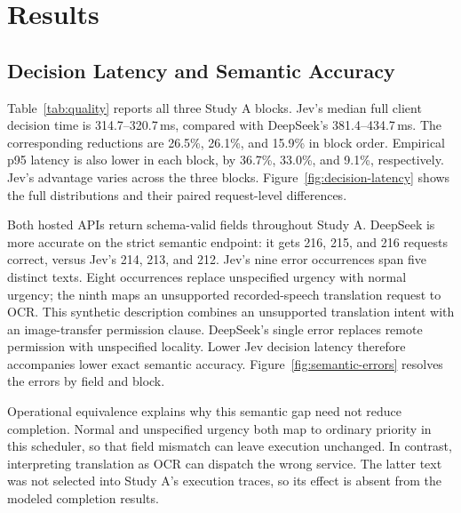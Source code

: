 \section{Results}
\label{sec:results}
\subsection{Decision Latency and Semantic Accuracy}

Table~\ref{tab:quality} reports all three Study A blocks. Jev's median full
client decision time is 314.7--320.7\,ms, compared with DeepSeek's
381.4--434.7\,ms. The corresponding reductions are 26.5\%, 26.1\%, and
15.9\% in block order. Empirical p95 latency is also lower in each block,
by 36.7\%, 33.0\%, and 9.1\%, respectively. Jev's advantage varies across
the three blocks. Figure~\ref{fig:decision-latency} shows the full distributions
and their paired request-level differences.

\begin{table}[t]
\caption{Study A: exact four-field correctness and client decision latency.
Each row contains 216 requests; the same texts recur across blocks.}
\label{tab:quality}
\centering

\end{table}



Both hosted APIs return schema-valid fields throughout Study A. DeepSeek
is more accurate on the strict semantic endpoint: it gets
216, 215, and 216 requests correct, versus Jev's 214, 213, and 212. Jev's
nine error occurrences span five distinct texts. Eight occurrences replace
unspecified urgency with normal urgency; the ninth maps an unsupported
recorded-speech translation request to OCR. This synthetic description
combines an unsupported translation intent with an image-transfer permission
clause. DeepSeek's single error replaces remote permission with unspecified
locality. Lower Jev decision latency therefore accompanies lower exact
semantic accuracy. Figure~\ref{fig:semantic-errors} resolves the errors by
field and block.

Operational equivalence explains why this semantic gap need not reduce
completion. Normal and unspecified urgency both map to ordinary
priority in this scheduler, so that field mismatch can leave execution
unchanged. In contrast, interpreting translation as OCR can dispatch the
wrong service. The latter text was not selected into Study A's execution
traces, so its effect is absent from the modeled completion results.

